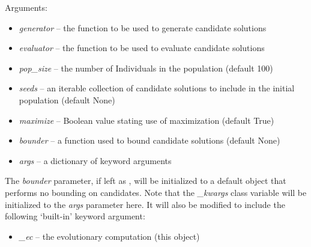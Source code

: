 \documentclass[letterpaper,10pt,english]{sphinxmanual}
\begin{document}
\begin{fulllineitems}
\begin{fulllineitems}
Arguments:
\begin{itemize}
\item {} 
\emph{generator} -- the function to be used to generate candidate solutions

\item {} 
\emph{evaluator} -- the function to be used to evaluate candidate solutions

\item {} 
\emph{pop\_size} -- the number of Individuals in the population (default 100)

\item {} 
\emph{seeds} -- an iterable collection of candidate solutions to include
in the initial population (default None)

\item {} 
\emph{maximize} -- Boolean value stating use of maximization (default True)

\item {} 
\emph{bounder} -- a function used to bound candidate solutions (default None)

\item {} 
\emph{args} -- a dictionary of keyword arguments

\end{itemize}

The \emph{bounder} parameter, if left as , will be initialized to a
default  object that performs no bounding on candidates.
Note that the \emph{\_kwargs} class variable will be initialized to the \emph{args} 
parameter here. It will also be modified to include the following `built-in' 
keyword argument:
\begin{itemize}
\item {} 
\emph{\_ec} -- the evolutionary computation (this object)

\end{itemize}

\end{fulllineitems}


\end{fulllineitems}

\end{document}
